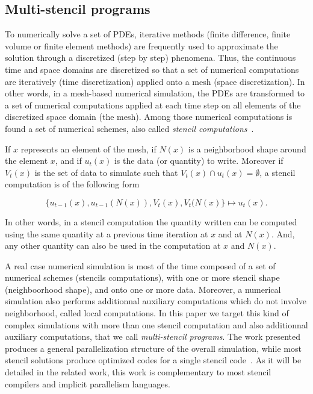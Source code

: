 \subsection{Multi-stencil programs}
\label{sect:multistencil}
To numerically solve a set of PDEs, iterative methods (finite difference, finite volume or finite element methods) are frequently used to approximate the solution through a discretized (step by step) phenomena. Thus, the continuous time and space domains are discretized so that a set of numerical computations are iteratively (time discretization) applied onto a mesh (space discretization). In other words, in a mesh-based numerical simulation, the PDEs are transformed to a set of numerical computations applied at each time step on all elements of the discretized space domain (the mesh). Among those numerical computations is found a set of numerical schemes, also called \textit{stencil computations}~\cite{spaaTangCKLL11}. 

If $x$ represents an element of the mesh, if $N(x)$ is a neighborhood shape around the element $x$, and if $u_t(x)$ is the data (or quantity) to write. Moreover if $V_t(x)$ is the set of data to simulate such that $V_t(x) \cap u_t(x) = \emptyset$, a stencil computation is of the following form

\begin{equation} 
\{u_{t-1}(x), u_{t-1}(N(x)), V_t(x), V_t(N(x)\} \longmapsto u_{t}(x).
\label{space}
\end{equation}

In other words, in a stencil computation the quantity written can be computed using the same quantity at a previous time iteration at $x$ and at $N(x)$. And, any other quantity can also be used in the computation at $x$ and $N(x)$.

A real case numerical simulation is most of the time composed of a set of numerical schemes (stencils computations), with one or more stencil shape (neighboorhood shape), and onto one or more data. Moreover, a numerical simulation also performs additionnal auxiliary computations which do not involve neighborhood, called local computations. In this paper we target this kind of complex simulations with more than one stencil computation and also additionnal auxiliary computations, that we call \emph{multi-stencil programs}. The work presented produces a general parallelization structure of the overall simulation, while most stencil solutions produce optimized codes for a single stencil code~\cite{citeulike12258902, spaaTangCKLL11, Giles2011}. As it will be detailed in the related work, this work is complementary to most stencil compilers and implicit parallelism languages.

